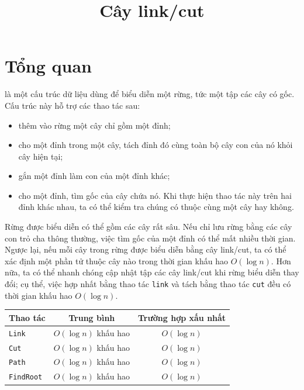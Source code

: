 \documentclass[11pt]{article}
\title{Cây link/cut}
\author{}
\date{}
\begin{document}
\maketitle


\section*{Tổng quan}

 là một cấu trúc dữ liệu dùng để biểu diễn một rừng, tức
một tập các cây có gốc. Cấu trúc này hỗ trợ các thao tác sau:
\begin{itemize}
  \item thêm vào rừng một cây chỉ gồm một đỉnh;
  \item cho một đỉnh trong một cây, tách đỉnh đó cùng toàn bộ cây con của nó
  khỏi cây hiện tại;
  \item gắn một đỉnh làm con của một đỉnh khác;
  \item cho một đỉnh, tìm gốc của cây chứa nó. Khi thực hiện thao tác này trên
  hai đỉnh khác nhau, ta có thể kiểm tra chúng có thuộc cùng một cây hay không.
\end{itemize}

Rừng được biểu diễn có thể gồm các cây rất sâu. Nếu chỉ lưu rừng bằng các cây
con trỏ cha thông thường, việc tìm gốc của một đỉnh có thể mất nhiều thời gian.
Ngược lại, nếu mỗi cây trong rừng được biểu diễn bằng cây link/cut, ta có thể
xác định một phần tử thuộc cây nào trong thời gian khấu hao $O(\log n)$.
Hơn nữa, ta có thể nhanh chóng cập nhật tập các cây link/cut khi rừng biểu
diễn thay đổi; cụ thể, việc hợp nhất bằng thao tác \texttt{link} và tách bằng
thao tác \texttt{cut} đều có thời gian khấu hao $O(\log n)$.

\begin{center}
\begin{tabular}{lcc}
\hline
\textbf{Thao tác} & \textbf{Trung bình} & \textbf{Trường hợp xấu nhất} \\
\hline
\texttt{Link} & $O(\log n)$ khấu hao & $O(\log n)$ \\
\texttt{Cut} & $O(\log n)$ khấu hao & $O(\log n)$ \\
\texttt{Path} & $O(\log n)$ khấu hao & $O(\log n)$ \\
\texttt{FindRoot} & $O(\log n)$ khấu hao & $O(\log n)$ \\
\hline
\end{tabular}
\end{center}
\end{document}
